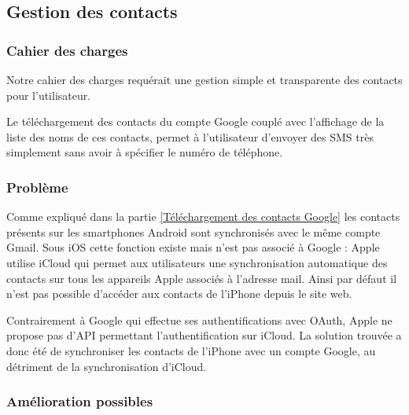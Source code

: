 \subsection{Gestion des contacts}


\subsubsection{Cahier des charges}

Notre cahier des charges requérait une gestion simple et transparente des contacts pour l'utilisateur.

Le téléchargement des contacts du compte Google couplé avec l'affichage de la liste des noms de ces contacts, permet à l'utilisateur d'envoyer des SMS très simplement sans avoir à spécifier le numéro de téléphone.


\subsubsection{Problème}

Comme expliqué dans la partie \ref{Téléchargement des contacts Google} les contacts présents sur les smartphones Android sont synchronisés avec le même compte Gmail.
Sous iOS cette fonction existe mais n'est pas associé à Google : Apple utilise iCloud qui permet aux utilisateurs une synchronisation automatique des contacts sur tous les appareils Apple associés à l'adresse mail.
Ainsi par défaut il n'est pas possible d'accéder aux contacts de l'iPhone depuis le site web.

Contrairement à Google qui effectue ses authentifications avec OAuth, Apple ne propose pas d'API permettant l'authentification sur iCloud.
La solution trouvée a donc été de synchroniser les contacts de l'iPhone avec un compte Google, au détriment de la synchronisation d'iCloud.


\subsubsection{Amélioration possibles}


